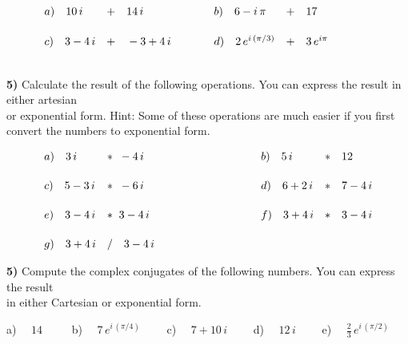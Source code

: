 \documentclass[11pt]{article}
\begin{document}
$\begin{array}{llll}
\hspace*{1cm} a)\quad 10\,i    &+\quad 14\,i   \svs   &  \hspace*{1cm} b)\quad 6 - i\,\pi &+\quad 17  \svs\\
\hspace*{1cm} c)\quad 3 - 4\,i   &+\quad -3+4\,i \svs &  \hspace*{1cm} d)\quad 2\,e^{i\,(\pi/3)} &+\quad 3\,e^{i\pi} \svs\\
 \end{array}$ \vs

\textbf{5)} Calculate the result of the following operations.
You can express the result in either artesian \\
\hspace*{5mm} or exponential
form. Hint: Some of these operations are much easier if you first
convert the
\hspace*{5mm} numbers to exponential form.

$\begin{array}{llll}
\hspace*{1cm} a)\quad 3\,i   & * \;\; -4\,i  \svs & \hspace*{3cm} b)\quad 5\,i   & *\quad 12     \svs\\
\hspace*{1cm} c)\quad 5-3\,i & * \;\; -6\,i  \svs & \hspace*{3cm} d)\quad 6+2\,i & *\quad 7-4\,i \svs \\
\hspace*{1cm} e)\quad 3-4\,i & * \;\; 3-4\,i \svs & \hspace*{3cm} f)\quad 3+4\,i & *\quad 3-4\,i \svs \\
\hspace*{1cm} g)\quad 3 + 4\, i & /\quad 3 - 4\,i  &&
\end{array}$ \vs


\textbf{5)} Compute the complex conjugates of the following numbers. You
can express the result \\
\hspace*{5mm} in either Cartesian or exponential form.

\hspace*{5mm} a) $\quad 14 \; \qquad$ b) $\quad 7\,e^{i\,(\pi/4)} \qquad$ c) $\quad 7+10\,i \qquad$
d) $\quad 12\,i \qquad$ e) $\quad \frac{2}{3} \, e^{i\,(\pi/2)}$
\end{document}
